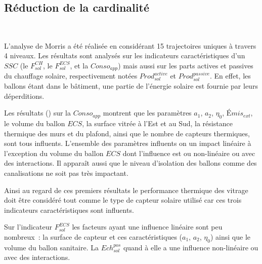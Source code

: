 \subsection{Réduction de la cardinalité} %
\label{sub:reduction_de_la_cardinalite}
~

L’analyse de Morris a été réalisée en considérant \num{15} trajectoires uniques à travers
\num{4} niveaux. Les résultats sont analysés sur les indicateurs caractéristiques d’un $SSC$
(le $F_{sol}^{CH}$, le $F_{sol}^{ECS}$, et la $Conso_{app}$) mais aussi sur les parts
actives et passives du chauffage solaire, respectivement notées $Prod_{sol}^{active}$ et
$Prod_{sol}^{passive}$. En effet, les ballons étant dans le bâtiment, une partie de
l’énergie solaire est fournie par leurs déperditions.

Les résultats () sur la $Conso_{app}$ montrent
que les paramètres $a_{1}$, $a_{2}$, $\eta_{0}$, $Émis_{ext}$, le volume du ballon $ECS$,
la surface vitrée à l’Est et au Sud, la résistance thermique des murs et du plafond, ainsi que le nombre de capteurs thermiques,
sont tous influents. L’ensemble des paramètres influents on un impact linéaire à l’exception
du volume du ballon $ECS$ dont l’influence est ou non-linéaire ou avec des interactions.
Il apparaît aussi que le niveau d’isolation des ballons comme des canalisations ne soit pas
très impactant.

Ainsi au regard de ces premiers résultats le performance thermique des vitrage doit être
considéré tout comme le type de capteur solaire utilisé car ces trois indicateurs caractéristiques
sont influents.

Sur l’indicateur $F_{sol}^{ECS}$ les facteurs ayant une influence linéaire sont
peu nombreux~: la surface de capteur et ces caractéristiques ($a_{1}$, $a_{2}$, $\eta_{0}$)
ainsi que le volume du ballon sanitaire. La $Ech_{sol}^{pos}$ quand à elle a une influence
non-linéaire ou avec des interactions.


